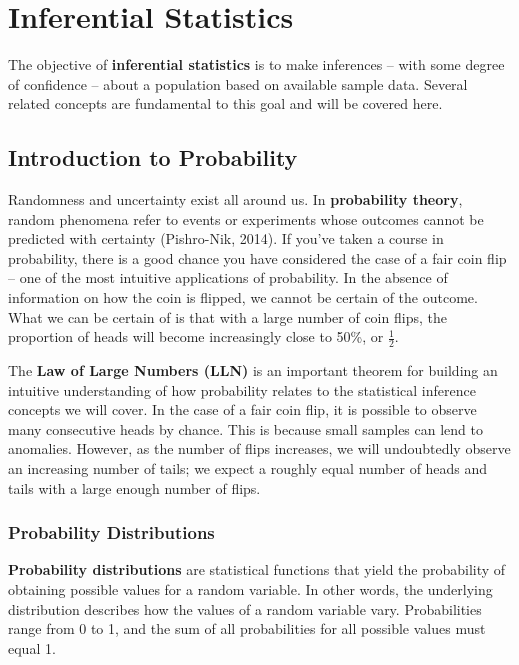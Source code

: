 \documentclass[]{book}
\begin{document}
\hypertarget{inf-stats}{%
\chapter{Inferential Statistics}\label{inf-stats}}

The objective of \textbf{inferential statistics} is to make inferences -- with some degree of confidence -- about a population based on available sample data. Several related concepts are fundamental to this goal and will be covered here.

\hypertarget{introduction-to-probability}{%
\section{Introduction to Probability}\label{introduction-to-probability}}

Randomness and uncertainty exist all around us. In \textbf{probability theory}, random phenomena refer to events or experiments whose outcomes cannot be predicted with certainty (Pishro-Nik, 2014). If you've taken a course in probability, there is a good chance you have considered the case of a fair coin flip -- one of the most intuitive applications of probability. In the absence of information on how the coin is flipped, we cannot be certain of the outcome. What we can be certain of is that with a large number of coin flips, the proportion of heads will become increasingly close to 50\%, or \(\frac{1}{2}\).

The \textbf{Law of Large Numbers (LLN)} is an important theorem for building an intuitive understanding of how probability relates to the statistical inference concepts we will cover. In the case of a fair coin flip, it is possible to observe many consecutive heads by chance. This is because small samples can lend to anomalies. However, as the number of flips increases, we will undoubtedly observe an increasing number of tails; we expect a roughly equal number of heads and tails with a large enough number of flips.

\hypertarget{probability-distributions}{%
\subsection{Probability Distributions}\label{probability-distributions}}

\textbf{Probability distributions} are statistical functions that yield the probability of obtaining possible values for a random variable. In other words, the underlying distribution describes how the values of a random variable vary. Probabilities range from 0 to 1, and the sum of all probabilities for all possible values must equal 1.
\end{document}
